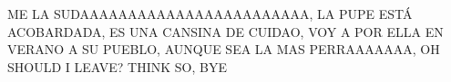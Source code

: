 %
%
%
%
% 

\pagestyle{empty} %



\pagestyle{fancy} %
\tableofcontents
\noindent\hrulefill

ME LA SUDAAAAAAAAAAAAAAAAAAAAAAAA, LA PUPE ESTÁ ACOBARDADA, ES UNA CANSINA DE CUIDAO, VOY A POR ELLA EN VERANO A SU PUEBLO, AUNQUE SEA LA MAS PERRAAAAAAA, OH SHOULD I LEAVE? THINK SO, BYE

\cleardoublepage
{}
\listoffigures
\noindent\hrulefill




\printbibliography[heading=bibintoc]
\label{bib:mybiblio}
